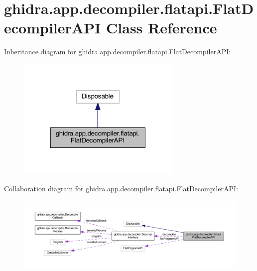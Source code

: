\hypertarget{classghidra_1_1app_1_1decompiler_1_1flatapi_1_1_flat_decompiler_a_p_i}{}\section{ghidra.\+app.\+decompiler.\+flatapi.\+Flat\+Decompiler\+A\+PI Class Reference}
\label{classghidra_1_1app_1_1decompiler_1_1flatapi_1_1_flat_decompiler_a_p_i}


Inheritance diagram for ghidra.\+app.\+decompiler.\+flatapi.\+Flat\+Decompiler\+A\+PI\+:
\nopagebreak
\begin{figure}[H]
\begin{center}
\leavevmode
\includegraphics[width=223pt]{classghidra_1_1app_1_1decompiler_1_1flatapi_1_1_flat_decompiler_a_p_i__inherit__graph}
\end{center}
\end{figure}


Collaboration diagram for ghidra.\+app.\+decompiler.\+flatapi.\+Flat\+Decompiler\+A\+PI\+:
\nopagebreak
\begin{figure}[H]
\begin{center}
\leavevmode
\includegraphics[width=350pt]{classghidra_1_1app_1_1decompiler_1_1flatapi_1_1_flat_decompiler_a_p_i__coll__graph}
\end{center}
\end{figure}
